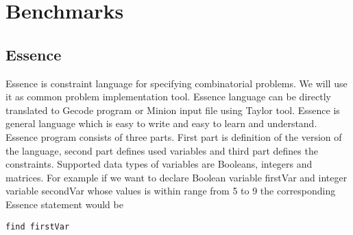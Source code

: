 \chapter{Benchmarks}
\thispagestyle{myheadings}

\section{Essence}
Essence is constraint language for specifying combinatorial problems. We will use it as common problem implementation tool. Essence language can be directly translated to Gecode program or Minion input file using Taylor tool. Essence is general language which is easy to write and easy to learn and understand. Essence program consists of three parts. First part is definition of the version of the language, second part defines used variables and third part defines the constraints. Supported data types of variables are Booleans, integers and matrices. For example if we want to declare Boolean variable firstVar and integer variable secondVar whose values is within range from 5 to 9 the corresponding Essence statement would be



\lstset{         %
  language=C++,
	basicstyle=\tiny,
  keywordstyle=\bfseries,
  identifierstyle=\itshape,
  stringstyle=\ttfamily,
  numbers=none,
  numberstyle=\tiny,
  numbersep=5pt,
  frameround=ffff,
  extendedchars=true,
  tab=~,
  tabsize=2,
  frame=single,
  captionpos=b,
  showspaces=false,
  showstringspaces=false,
  breaklines=true
}



\begin{lstlisting}
find firstVar
\end{lstlisting} 



